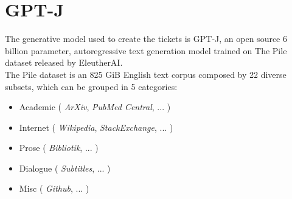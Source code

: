 \section{GPT-J}
\label{sec:gpt_j}

The generative model used to create the tickets is GPT-J, an open source 6 billion parameter, autoregressive text generation model trained on The Pile dataset released by EleutherAI. \\
The Pile dataset\cite{gao2020pile} is an 825 GiB English text corpus composed by 22 diverse subsets, which can be grouped in 5 categories:
\begin{itemize}
    \item Academic ( \textit{ArXiv}, \textit{PubMed Central}, ... )
    \item Internet ( \textit{Wikipedia}, \textit{StackExchange}, ... )
    \item Prose ( \textit{Bibliotik}, ... )
    \item Dialogue ( \textit{Subtitles}, ... )
    \item Misc ( \textit{Github}, ... )
\end{itemize}
